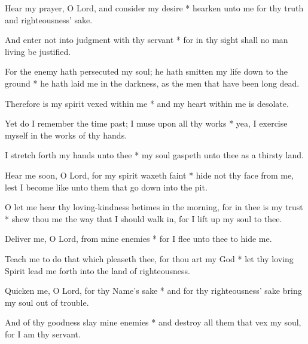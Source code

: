 Hear my prayer, O Lord, and consider my desire * hearken unto me for thy truth and righteousness' sake.

And enter not into judgment with thy servant * for in thy sight shall no man living be justified.

For the enemy hath persecuted my soul; he hath smitten my life down to the ground * he hath laid me in the darkness, as the men that have been long dead.

Therefore is my spirit vexed within me * and my heart within me is desolate.

Yet do I remember the time past; I muse upon all thy works * yea, I exercise myself in the works of thy hands.

I stretch forth my hands unto thee * my soul gaspeth unto thee as a thirsty land.

Hear me soon, O Lord, for my spirit waxeth faint * hide not thy face from me, lest I become like unto them that go down into the pit.

O let me hear thy loving-kindness betimes in the morning, for in thee is my trust * shew thou me the way that I should walk in, for I lift up my soul to thee.

Deliver me, O Lord, from mine enemies * for I flee unto thee to hide me.

Teach me to do that which pleaseth thee, for thou art my God * let thy loving Spirit lead me forth into the land of righteousness.

Quicken me, O Lord, for thy Name's sake * and for thy righteousness' sake bring my soul out of trouble.

And of thy goodness slay mine enemies * and destroy all them that vex my soul, for I am thy servant.
